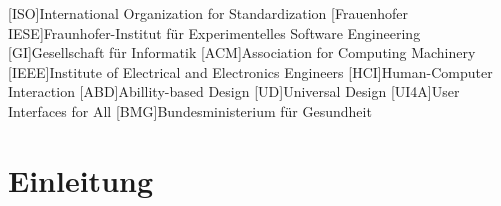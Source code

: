 \documentclass[sigchi-a,screen,nonacm,language=german]{acmart}
\theoremstyle{acmdefinition}
\begin{document}



\maketitle

\begin{acronym}
  [ISO]{International Organization for Standardization}
  [Frauenhofer IESE]{Fraunhofer-Institut für Experimentelles Software Engineering}
  [GI]{Gesellschaft für Informatik}
  [ACM]{Association for Computing Machinery}
  [IEEE]{Institute of Electrical and Electronics Engineers}
  [HCI]{Human-Computer Interaction}
  [ABD]{Abillity-based Design}
  [UD]{Universal Design}
  [UI4A]{User Interfaces for All}
  [BMG]{Bundesministerium für Gesundheit}
\end{acronym}




\section{Einleitung}
\label{sec:einleitung}
\end{document}
